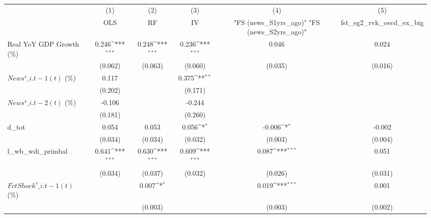 {
\def\sym#1{\ifmmode^{#1}\else\(^{#1}\)\fi}
\begin{tabular}{l*{5}{c}}
\toprule
                    &\multicolumn{1}{c}{(1)}&\multicolumn{1}{c}{(2)}&\multicolumn{1}{c}{(3)}&\multicolumn{1}{c}{(4)}&\multicolumn{1}{c}{(5)}\\
                    &\multicolumn{1}{c}{OLS}&\multicolumn{1}{c}{RF}&\multicolumn{1}{c}{IV}&\multicolumn{1}{c}{ "FS (news\_S1yrs\_ago)"  "FS (news\_S2yrs\_ago)" }&\multicolumn{1}{c}{fst\_eg2\_rvk\_oecd\_ex\_big}\\
\midrule
Real YoY GDP Growth (\%)&       0.246\sym{***}&       0.248\sym{***}&       0.236\sym{***}&       0.046         &       0.024         \\
                    &     (0.062)         &     (0.063)         &     (0.060)         &     (0.035)         &     (0.016)         \\
\addlinespace
$ News^s\_{i.t-1}(t)$ (\%)&       0.117         &                     &       0.375\sym{**} &                     &                     \\
                    &     (0.202)         &                     &     (0.171)         &                     &                     \\
\addlinespace
$ News^s\_{i.t-2}(t)$ (\%)&      -0.106         &                     &      -0.244         &                     &                     \\
                    &     (0.181)         &                     &     (0.260)         &                     &                     \\
\addlinespace
d\_tot               &       0.054         &       0.053         &       0.056\sym{*}  &      -0.006\sym{*}  &      -0.002         \\
                    &     (0.034)         &     (0.034)         &     (0.032)         &     (0.003)         &     (0.004)         \\
\addlinespace
l\_wb\_wdi\_primbal    &       0.641\sym{***}&       0.630\sym{***}&       0.609\sym{***}&       0.087\sym{***}&       0.051         \\
                    &     (0.034)         &     (0.037)         &     (0.032)         &     (0.026)         &     (0.031)         \\
\addlinespace
$ FctShock^s\_{i.t-1}(t)$ (\%)&                     &       0.007\sym{*}  &                     &       0.019\sym{***}&       0.001         \\
                    &                     &     (0.003)         &                     &     (0.003)         &     (0.002)         \\

\end{tabular}}
